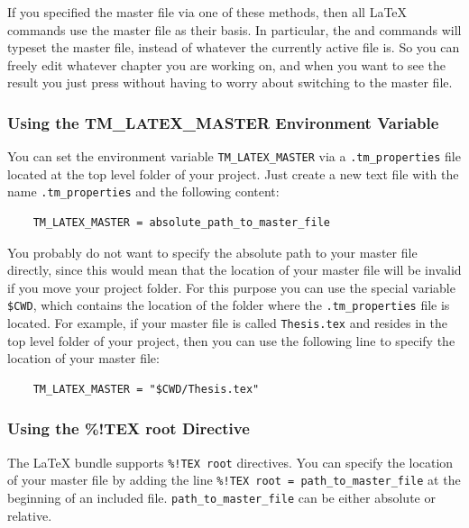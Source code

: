 \documentclass[11pt, x11names]{article}
\begin{document}
If you specified the master file via one of these methods, then all LaTeX commands use the master file as their basis. In particular, the  and  commands will typeset the master file, instead of whatever the currently active file is. So you can freely edit whatever chapter you are working on, and when you want to see the result you just press  without having to worry about switching to the master file.

\subsubsection{Using the TM\_LATEX\_MASTER Environment Variable}
\label{sec:Using_TM_LATEX_MASTER}

You can set the environment variable \texttt{TM\_LATEX\_MASTER} via a \texttt{.tm\_properties} file located at the top level folder of your project. Just create a new text file with the name \texttt{.tm\_properties} and the following content:

\begin{verbatim}
    TM_LATEX_MASTER = absolute_path_to_master_file
\end{verbatim}

You probably do not want to specify the absolute path to your master file directly, since this would mean that the location of your master file will be invalid if you move your project folder. For this purpose you can use the special variable \texttt{\$CWD}, which contains the location of the folder where the \texttt{.tm\_properties} file is located. For example, if your master file is called \texttt{Thesis.tex} and resides in the top level folder of your project, then you can use the following line to specify the location of your master file:

\begin{verbatim}
    TM_LATEX_MASTER = "$CWD/Thesis.tex"
\end{verbatim}

\subsubsection{Using the \%!TEX root Directive}
\label{sec:Using_TM_TEX_ROOT}

The LaTeX bundle supports \texttt{\%!TEX\ root} directives. You can specify the location of your master file by adding the line \texttt{\%!TEX\ root\ =\ path\_to\_master\_file} at the beginning of an included file. \texttt{path\_to\_master\_file} can be either absolute or relative.\\
\end{document}
